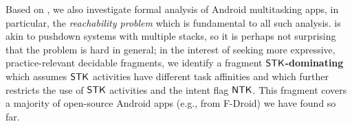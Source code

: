 %

Based on {\AMASS}, we also %
investigate formal analysis of Android multitasking apps, %
in particular, the \emph{reachability problem} which is fundamental to all such analysis. {\AMASS} is akin to pushdown systems with multiple stacks, so it is perhaps not surprising that the problem is hard in general; 
in the interest of seeking more expressive, practice-relevant decidable fragments,
we identify a fragment \textbf{$\mathsf{STK}$-dominating {\AMASS}} which assumes 
$\mathsf{STK}$ activities have different task affinities and which further restricts the use of $\mathsf{STK}$ activities and the intent flag ${\sf NTK}$. This fragment covers a majority of open-source Android apps (e.g., from F-Droid) we have found so far. 

